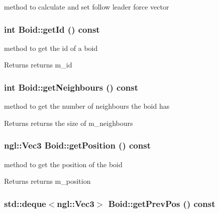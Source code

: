 method to calculate and set follow leader force vector \hypertarget{classBoid_a579520e335b6033643531218eae95be0}{
\subsubsection[{getId}]{\setlength{\rightskip}{0pt plus 5cm}int Boid::getId () const}}
\label{classBoid_a579520e335b6033643531218eae95be0}


method to get the id of a boid \begin{DoxyReturn}{Returns}
returns m\_\-id 
\end{DoxyReturn}
\hypertarget{classBoid_ae4d6cb62f1811008b923e1d1bf349430}{
\subsubsection[{getNeighbours}]{\setlength{\rightskip}{0pt plus 5cm}int Boid::getNeighbours () const}}
\label{classBoid_ae4d6cb62f1811008b923e1d1bf349430}


method to get the number of neighbours the boid has \begin{DoxyReturn}{Returns}
returns the size of m\_\-neighbours 
\end{DoxyReturn}
\hypertarget{classBoid_a8d92ae43f4b135661bb93afd46c90e94}{
\subsubsection[{getPosition}]{\setlength{\rightskip}{0pt plus 5cm}ngl::Vec3 Boid::getPosition () const}}
\label{classBoid_a8d92ae43f4b135661bb93afd46c90e94}


method to get the position of the boid \begin{DoxyReturn}{Returns}
returns m\_\-position 
\end{DoxyReturn}
\hypertarget{classBoid_a163a4e33a2c404f8796160ed3277b9b5}{
\subsubsection[{getPrevPos}]{\setlength{\rightskip}{0pt plus 5cm}std::deque$<$ngl::Vec3$>$ Boid::getPrevPos () const}}
\label{classBoid_a163a4e33a2c404f8796160ed3277b9b5}


